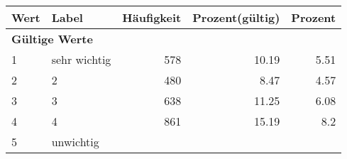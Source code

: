      \begin{longtable}{lXrrr}
     \toprule
     \textbf{Wert} & \textbf{Label} & \textbf{Häufigkeit} & \textbf{Prozent(gültig)} & \textbf{Prozent} \\
     \endhead
     \midrule
     \multicolumn{5}{l}{\textbf{Gültige Werte}}\\

     1 &
     \multicolumn{1}{X}{ sehr wichtig   } &


       \num{578} &
       \num[round-mode=places,round-precision=2]{10.19} &
         \num[round-mode=places,round-precision=2]{5.51} \\

     2 &
     \multicolumn{1}{X}{ 2   } &


       \num{480} &
       \num[round-mode=places,round-precision=2]{8.47} &
         \num[round-mode=places,round-precision=2]{4.57} \\

     3 &
     \multicolumn{1}{X}{ 3   } &


       \num{638} &
       \num[round-mode=places,round-precision=2]{11.25} &
         \num[round-mode=places,round-precision=2]{6.08} \\

     4 &
     \multicolumn{1}{X}{ 4   } &


       \num{861} &
       \num[round-mode=places,round-precision=2]{15.19} &
         \num[round-mode=places,round-precision=2]{8.2} \\

     5 &
     \multicolumn{1}{X}{ unwichtig   } &



\end{longtable}
